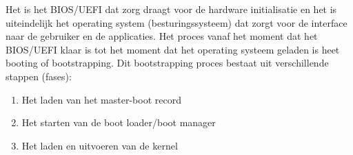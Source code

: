 Het is het BIOS/UEFI dat zorg draagt voor de hardware initialisatie en het is uiteindelijk het operating system (besturingssysteem) dat zorgt voor de interface naar de gebruiker en de applicaties. Het proces vanaf het moment dat het BIOS/UEFI klaar is tot het moment dat het operating systeem geladen is heet booting of bootstrapping. Dit bootstrapping proces bestaat uit verschillende stappen (fases):
\begin{enumerate}
	\item Het laden van het master-boot record
	\item Het starten van de boot loader/boot manager
	\item Het laden en uitvoeren van de kernel
\end{enumerate}
